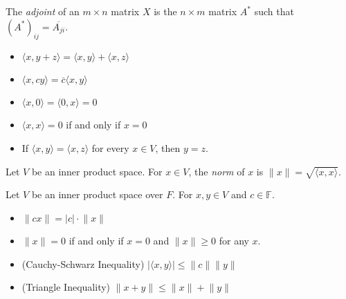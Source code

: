\documentclass[12pt]{article}
\newenvironment{theorem}[2][Theorem]{\begin{trivlist}
\item[\hskip \labelsep {\bfseries #1}\hskip \labelsep {\bfseries #2.}]}{\end{trivlist}}
\newenvironment{definition}[2][Definition]{\begin{trivlist}
\item[\hskip \labelsep {\bfseries #1}\hskip \labelsep {\bfseries #2}]}{\end{trivlist}}
\begin{document}
\begin{definition}{2}
The \textit{adjoint} of an $m \times n$ matrix $X$ is the $n \times m$ matrix $A^*$ such that $(A^*)_{ij} = \overline{A_{ji}}$.
\end{definition}

\begin{theorem}{6.1} \text{ }
\begin{itemize}
    \item $\langle x, y + z \rangle = \langle x, y \rangle + \langle x, z \rangle$
    
    \item $\langle x, cy \rangle = \overline{c}\langle x, y \rangle$
    
    \item $\langle x, 0 \rangle = \langle 0, x \rangle = 0$
    
    \item $\langle x, x \rangle = 0$ if and only if $x = 0$
    
    \item If $\langle x, y \rangle = \langle x, z \rangle$ for every $x \in V$, then $y = z$.
\end{itemize}
\end{theorem}

\begin{definition}{3}
Let $V$ be an inner product space. For $x \in V$, the \textit{norm} of $x$ is $\lVert x \rVert = \sqrt{\langle x, x \rangle}$.
\end{definition}

\begin{theorem}{6.2}
Let $V$ be an inner product space over $F$. For $x,y \in V$ and $c \in \mathbb{F}$.

\begin{itemize}
    \item[(a)] $\lVert cx \rVert = |c| \cdot \lVert x \rVert$
    
    \item[(b)] $\lVert x \rVert = 0$ if and only if $x = 0$ and $\lVert x \rVert \geq 0$ for any $x$.
    
    \item[(c)] (Cauchy-Schwarz Inequality) $\lvert \langle x, y \rangle \rvert \leq \lVert c \rVert \lVert y \rVert$
    
    \item[(d)] (Triangle Inequality) $\lVert x + y \rVert \leq \lVert x \rVert + \lVert y \rVert$
\end{itemize}
\end{theorem}
\end{document}
